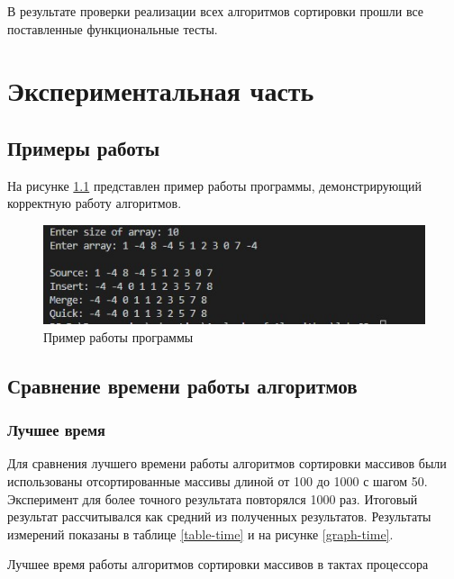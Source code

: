 \documentclass[12pt, a4paper]{report}
\begin{document}
	В результате проверки реализации всех алгоритмов сортировки прошли все поставленные функциональные тесты.

	\chapter{Экспериментальная часть}
	\section{Примеры работы}
	На рисунке \ref{pic:example} представлен пример работы программы, демонстрирующий корректную работу алгоритмов.
	\begin{figure}[ht!]
		\centering
		\includegraphics[scale=0.8]{example.jpg}
		\caption{Пример работы программы}
		\label{pic:example}
	\end{figure}
	
	\section{Сравнение времени работы алгоритмов}
	\subsection{Лучшее время}
	Для сравнения лучшего времени работы алгоритмов сортировки массивов были использованы отсортированные массивы длиной от 100 до 1000 с шагом 50. Эксперимент для более точного результата повторялся 1000 раз. Итоговый результат рассчитывался как средний из полученных результатов. Результаты измерений показаны в таблице \ref{table-time} и на рисунке \ref{graph-time}.\\
	\begin{table}[ht!]
		\caption{Лучшее время работы алгоритмов сортировки массивов в тактах процессора}
		\label{table-time}
		\begin{center}
		\end{center}
	\end{table}
	
\end{document}
